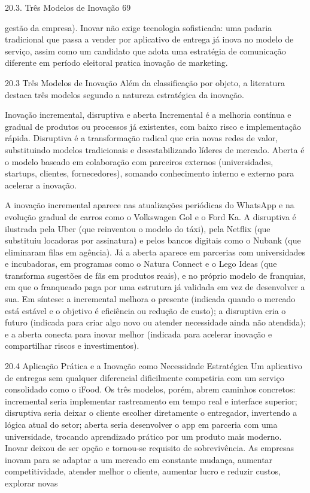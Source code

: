 20.3. Três Modelos de Inovação 69

gestão da empresa). Inovar não exige tecnologia sofisticada: uma padaria tradicional que passa a vender por aplicativo de entrega já inova no modelo de serviço, assim como um candidato que adota uma estratégia de comunicação diferente em período eleitoral pratica inovação de marketing.

20.3 Três Modelos de Inovação Além da classificação por objeto, a literatura destaca três modelos segundo a natureza estratégica da inovação.

Inovação incremental, disruptiva e aberta Incremental é a melhoria contínua e gradual de produtos ou processos já existentes, com baixo risco e implementação rápida. Disruptiva é a transformação radical que cria novas redes de valor, substituindo modelos tradicionais e desestabilizando líderes de mercado. Aberta é o modelo baseado em colaboração com parceiros externos (universidades, startups, clientes, fornecedores), somando conhecimento interno e externo para acelerar a inovação.

A inovação incremental aparece nas atualizações periódicas do WhatsApp e na evolução gradual de carros como o Volkswagen Gol e o Ford Ka. A disruptiva é ilustrada pela Uber (que reinventou o modelo do táxi), pela Netflix (que substituiu locadoras por assinatura) e pelos bancos digitais como o Nubank (que eliminaram filas em agência). Já a aberta aparece em parcerias com universidades e incubadoras, em programas como o Natura Connect e o Lego Ideas (que transforma sugestões de fãs em produtos reais), e no próprio modelo de franquias, em que o franqueado paga por uma estrutura já validada em vez de desenvolver a sua. Em síntese: a incremental melhora o presente (indicada quando o mercado está estável e o objetivo é eficiência ou redução de custo); a disruptiva cria o futuro (indicada para criar algo novo ou atender necessidade ainda não atendida); e a aberta conecta para inovar melhor (indicada para acelerar inovação e compartilhar riscos e investimentos).

20.4 Aplicação Prática e a Inovação como Necessidade Estratégica Um aplicativo de entregas sem qualquer diferencial dificilmente competiria com um serviço consolidado como o iFood. Os três modelos, porém, abrem caminhos concretos: incremental seria implementar rastreamento em tempo real e interface superior; disruptiva seria deixar o cliente escolher diretamente o entregador, invertendo a lógica atual do setor; aberta seria desenvolver o app em parceria com uma universidade, trocando aprendizado prático por um produto mais moderno. Inovar deixou de ser opção e tornou-se requisito de sobrevivência. As empresas inovam para se adaptar a um mercado em constante mudança, aumentar competitividade, atender melhor o cliente, aumentar lucro e reduzir custos, explorar novas

